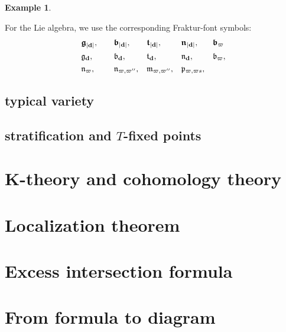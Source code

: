 \documentclass[reqno,11pt]{book}
\numberwithin{equation}{section}
\theoremstyle{plain}
\newtheorem{eg}[theorem]{Example}
\theoremstyle{plain}
\numberwithin{equation}{section}
\theoremstyle{remark}
\newcommand{\dimvec}[1]{\mathbf{#1}}
\newcommand{\abdimvec}[1]{|\dimvec{#1}|}
\newcommand{\ww}{\varpi}
\begin{document}
\begin{eg}
\end{eg}

For the Lie algebra, we use the corresponding Fraktur-font symbols:
\begin{equation*}
\begin{aligned}
  & \boldsymbol{\mathfrak{g}}_{\abdimvec{d}}, &&\boldsymbol{\mathfrak{b}}_{\abdimvec{d}}, &&\boldsymbol{\mathfrak{t}}_{\abdimvec{d}}, &&\boldsymbol{\mathfrak{n}}_{\abdimvec{d}}, &&\boldsymbol{\mathfrak{b}}_{\ww}  \\
  & \mathfrak{g}_{\dimvec{d}},
  &&\mathfrak{b}_{\dimvec{d}},
  &&\mathfrak{t}_{\dimvec{d}},
  &&\mathfrak{n}_{\dimvec{d}},
  &&\mathfrak{b}_{\ww},\\
  & \mathfrak{n}_{\ww},\hspace{5mm}
  &&\mathfrak{n}_{\ww,\ww''},
  &&\mathfrak{m}_{\ww,\ww''},
  &&\mathfrak{p}_{\ww,\ww s},
  &&\\
\end{aligned}
\end{equation*}

\section{typical variety}
\section{stratification and $T$-fixed points}
\chapter{K-theory and cohomology theory}
\chapter{Localization theorem}

\chapter{Excess intersection formula}

\chapter{From formula to diagram}
\end{document}
